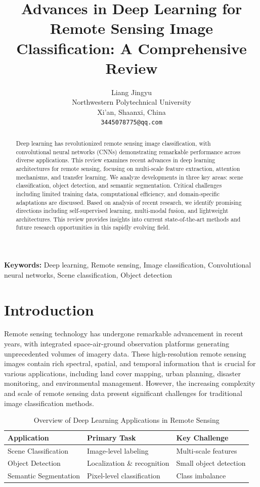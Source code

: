 \documentclass[12pt,a4paper]{article}
\title{\fontsize{14}{17}\selectfont\textbf{Advances in Deep Learning for Remote Sensing Image Classification: A Comprehensive Review}}
\author{Liang Jingyu\\
Northwestern Polytechnical University\\
Xi'an, Shaanxi, China\\
\texttt{3445078775@qq.com}}
\date{}
\begin{document}
\maketitle

\begin{abstract}
Deep learning has revolutionized remote sensing image classification, with convolutional neural networks (CNNs) demonstrating remarkable performance across diverse applications. This review examines recent advances in deep learning architectures for remote sensing, focusing on multi-scale feature extraction, attention mechanisms, and transfer learning. We analyze developments in three key areas: scene classification, object detection, and semantic segmentation. Critical challenges including limited training data, computational efficiency, and domain-specific adaptations are discussed. Based on analysis of recent research, we identify promising directions including self-supervised learning, multi-modal fusion, and lightweight architectures. This review provides insights into current state-of-the-art methods and future research opportunities in this rapidly evolving field.
\end{abstract}

\textbf{Keywords:} Deep learning, Remote sensing, Image classification, Convolutional neural networks, Scene classification, Object detection

\section{Introduction}
\label{sec:introduction}

Remote sensing technology has undergone remarkable advancement in recent years, with integrated space-air-ground observation platforms generating unprecedented volumes of imagery data. These high-resolution remote sensing images contain rich spectral, spatial, and temporal information that is crucial for various applications, including land cover mapping, urban planning, disaster monitoring, and environmental management. However, the increasing complexity and scale of remote sensing data present significant challenges for traditional image classification methods.

\begin{table}[htbp]
\centering
\caption{Overview of Deep Learning Applications in Remote Sensing}
\label{tab:applications}
\begin{tabular}{@{}lll@{}}
\toprule
\textbf{Application} & \textbf{Primary Task} & \textbf{Key Challenge} \\ 
\midrule
Scene Classification & Image-level labeling & Multi-scale features \\
Object Detection & Localization \& recognition & Small object detection \\
Semantic Segmentation & Pixel-level classification & Class imbalance \\
\bottomrule
\end{tabular}
\end{table}
\end{document}
